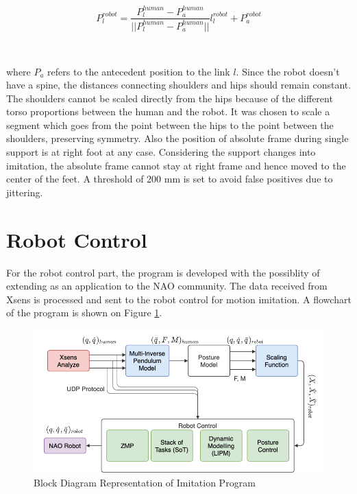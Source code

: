 \begin{equation}
    P_l^{robot} = \frac{P_l^{human} - P_a^{human}}{||P_l^{human} - P_a^{human}||}l_l^{robot} + P_a^{robot}
\end{equation}

~

where $P_a$ refers to the antecedent position to the link $l$. Since the robot doesn’t have a spine, the distances connecting shoulders and hips 
should remain constant. The shoulders cannot be scaled directly from the hips because of the different torso proportions between the human and the 
robot. It was chosen to scale a segment which goes from the point between the hips to the point between the shoulders, preserving symmetry. Also the 
position of absolute frame during single support is at right foot at any case. Considering the support changes into imitation, the absolute frame 
cannot stay at right frame and hence moved to the center of the feet. A threshold of 200 mm is set to avoid false positives due to jittering.

\section{Robot Control}

For the robot control part, the program is developed with the possiblity of extending as an application to the NAO community. The data received from 
Xsens is processed and sent to the robot control for motion imitation. A flowchart of the program is shown on Figure \ref{fig: flowchart-robot-control}.

\begin{figure}[h!]
    \centering
    \includegraphics[scale=0.5]{images/flowchart-block-diagram.png}\hfill
    \caption{Block Diagram Representation of Imitation Program}\hfill
    \label{fig: flowchart-robot-control}
\end{figure}